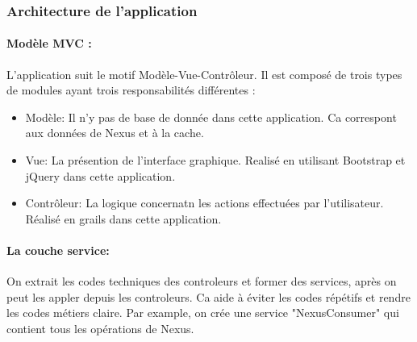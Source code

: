 \subsubsection*{Architecture de l'application}
\paragraph{Modèle MVC :}
L'application suit le motif Modèle-Vue-Contrôleur.
Il est composé de  trois types de modules ayant trois responsabilités différentes :
\begin{itemize}
 \item Modèle: Il n'y pas de base de donnée dans cette application. Ca correspont aux données de Nexus et à la cache.
 \item Vue: La présention de l'interface graphique. Realisé en utilisant Bootstrap et jQuery dans cette application.
 \item Contrôleur: La logique concernatn les actions effectuées par l'utilisateur. Réalisé en grails dans cette application.
\end{itemize}

\paragraph{La couche service:}
On extrait les codes techniques des controleurs et former des services, après on peut les appler depuis les controleurs.
Ca aide à éviter les codes répétifs et rendre les codes métiers claire.
Par example, on crée une service "NexusConsumer" qui contient tous les opérations de Nexus.

\clearpage
